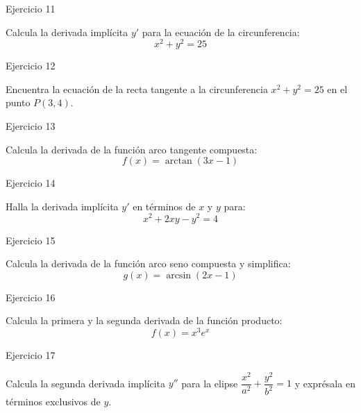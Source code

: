 \documentclass[aspectratio=169]{beamer}
\begin{document}
\begin{frame}{Ejercicio 11}
  \begin{mwejercicio}
    Calcula la derivada implícita $y'$ para la ecuación de la circunferencia:
    $$x^2 + y^2 = 25$$
  \end{mwejercicio}
  \vspace{3.5cm}
\end{frame}
\begin{frame}{Ejercicio 12}
  \begin{mwejercicio}
    Encuentra la ecuación de la recta tangente a la circunferencia $x^2 + y^2 = 25$ en el punto $P(3, 4)$.
  \end{mwejercicio}
  \vspace{3.5cm}
\end{frame}
\begin{frame}{Ejercicio 13}
  \begin{mwejercicio}
    Calcula la derivada de la función arco tangente compuesta:
    $$f(x) = \arctan(3x - 1)$$
  \end{mwejercicio}
  \vspace{3.5cm}
\end{frame}
\begin{frame}{Ejercicio 14}
  \begin{mwejercicio}
    Halla la derivada implícita $y'$ en términos de $x$ y $y$ para:
    $$x^2 + 2xy - y^2 = 4$$
  \end{mwejercicio}
  \vspace{3.5cm}
\end{frame}
\begin{frame}{Ejercicio 15}
  \begin{mwejercicio}
    Calcula la derivada de la función arco seno compuesta y simplifica:
    $$g(x) = \arcsin(2x - 1)$$
  \end{mwejercicio}
  \vspace{3.5cm}
\end{frame}
\begin{frame}{Ejercicio 16}
  \begin{mwejercicio}
    Calcula la primera y la segunda derivada de la función producto:
    $$f(x) = x^3 e^x$$
  \end{mwejercicio}
  \vspace{3.5cm}
\end{frame}
\begin{frame}{Ejercicio 17}
  \begin{mwejercicio}
    Calcula la segunda derivada implícita $y''$ para la elipse $\dfrac{x^2}{a^2} + \dfrac{y^2}{b^2} = 1$ y exprésala en términos exclusivos de $y$.
  \end{mwejercicio}
  \vspace{3.5cm}
\end{frame}
\end{document}
